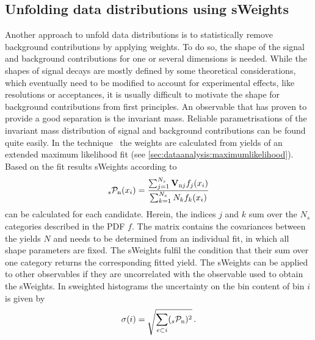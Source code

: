 
\subsection{Unfolding data distributions using sWeights}
\label{sec:dataanalysis:selection:splot}

Another approach to unfold data distributions is to statistically remove
background contributions by applying weights. To do so, the shape of the
signal and background contributions for one or several dimensions is needed.
While the shapes of signal decays are mostly defined by some theoretical
considerations, which eventually need to be modified to account for
experimental effects, like resolutions or acceptances, it is usually difficult
to motivate the shape for background contributions from first principles. An
observable that has proven to provide a good separation is the invariant mass.
Reliable parametrisations of the invariant mass distribution of signal and
background contributions can be found quite easily. In the \SPlot
technique~\cite{Pivk:2004ty} the weights are calculated from yields of an
extended maximum likelihood fit (see
\cref{sec:dataanalysis:maximumlikelihood}). Based on the fit results sWeights
according to
\begin{align}
	_{s}\mathcal{P}_\text{n}(x_i) = \frac{\sum_{j = 1}^{N_s}\mathbf{V}_{\text{n}j}f_j(x_i)}{\sum_{k = 1}^{N_s} N_k f_k(x_i)}
\label{eq:dataanalysis:selection:splot:weightdefinition}
\end{align}
can be calculated for each candidate. Herein, the indices $j$ and $k$ sum over
the $N_s$ categories described in the PDF $f$. The matrix  contains
the covariances between the yields $N$ and needs to be determined from an
individual fit, in which all shape parameters are fixed. The sWeights
fulfil the condition that their sum over one category returns the
corresponding fitted yield. The sWeights can be applied to other observables
if they are uncorrelated with the observable used to obtain the sWeights. In
sweighted histograms the uncertainty on the bin content of bin $i$ is given by
\begin{align}
	\sigma(i) = \sqrt{\sum_{e \subset i} (_{s}\mathcal{P}_\text{n})^2}\,.
\label{eq:dataanalysis:selection:splot:weighterror}
\end{align}